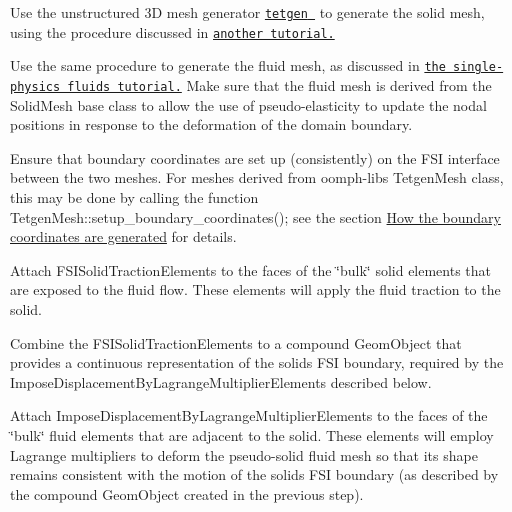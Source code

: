 \begin{DoxyEnumerate}
\item Use the unstructured 3D mesh generator \href{http://wias-berlin.de/software/tetgen//}{\tt {\ttfamily tetgen} } to generate the solid mesh, using the procedure discussed in \href{../../../solid/unstructured_three_d_solid/html/index.html#mesh}{\tt another tutorial.} ~\newline
~\newline

\item Use the same procedure to generate the fluid mesh, as discussed in \href{../../../navier_stokes/unstructured_three_d_fluid/html/index.html#mesh}{\tt the single-\/physics fluids tutorial.} Make sure that the fluid mesh is derived from the {\ttfamily Solid\+Mesh} base class to allow the use of pseudo-\/elasticity to update the nodal positions in response to the deformation of the domain boundary. ~\newline
~\newline

\item Ensure that boundary coordinates are set up (consistently) on the F\+SI interface between the two meshes. For meshes derived from {\ttfamily oomph-\/lib\textquotesingle{}s} {\ttfamily Tetgen\+Mesh} class, this may be done by calling the function {\ttfamily Tetgen\+Mesh\+::setup\+\_\+boundary\+\_\+coordinates()}; see the section \hyperlink{index_boundary_coord}{How the boundary coordinates are generated} for details. ~\newline
~\newline

\item Attach {\ttfamily F\+S\+I\+Solid\+Traction\+Elements} to the faces of the \char`\"{}bulk\char`\"{} solid elements that are exposed to the fluid flow. These elements will apply the fluid traction to the solid. ~\newline
~\newline

\item Combine the {\ttfamily F\+S\+I\+Solid\+Traction\+Elements} to a compound {\ttfamily Geom\+Object} that provides a continuous representation of the solid\textquotesingle{}s F\+SI boundary, required by the {\ttfamily Impose\+Displacement\+By\+Lagrange\+Multiplier\+Elements} described below. ~\newline
~\newline

\item Attach {\ttfamily Impose\+Displacement\+By\+Lagrange\+Multiplier\+Elements} to the faces of the \char`\"{}bulk\char`\"{} fluid elements that are adjacent to the solid. These elements will employ Lagrange multipliers to deform the pseudo-\/solid fluid mesh so that its shape remains consistent with the motion of the solid\textquotesingle{}s F\+SI boundary (as described by the compound {\ttfamily Geom\+Object} created in the previous step). ~\newline
~\newline


\end{DoxyEnumerate}
